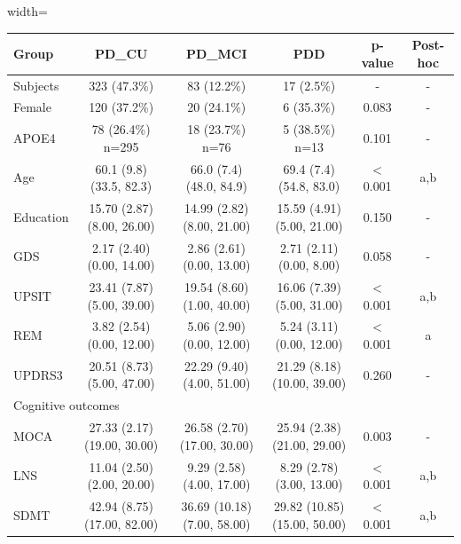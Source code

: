 \begin{description}
	\begin{table}[t]
		\begin{adjustbox}{width=\textwidth}
			\begin{tabular}{|l||c|c|c|c|c|}
				\toprule
				Group &                              PD\_CU &                             PD\_MCI &                        PDD &   p-value & Post-hoc \\ 
				\midrule
				Subjects &                        323 (47.3\%) &                         83 (12.2\%) &                          17 (2.5\%) &     -      &    -      \\
				Female &                        120 (37.2\%) &                         20 (24.1\%) &                          6 (35.3\%) &     0.083 &  -    \\
				APOE4 &                   78 (26.4\%) n=295 &                    18 (23.7\%) n=76 &                     5 (38.5\%) n=13 &     0.101 &  -    \\
				Age &            60.1 (9.8) (33.5, 82.3) &            66.0 (7.4) (48.0, 84.9) &            69.4 (7.4) (54.8, 83.0) & $<$ 0.001 &      a,b \\
				Education &         15.70 (2.87) (8.00, 26.00) &         14.99 (2.82) (8.00, 21.00) &         15.59 (4.91) (5.00, 21.00) &     0.150 &  -    \\
				\hline
				GDS &          2.17 (2.40) (0.00, 14.00) &          2.86 (2.61) (0.00, 13.00) &           2.71 (2.11) (0.00, 8.00) &     0.058 &   -   \\
				UPSIT &         23.41 (7.87) (5.00, 39.00) &         19.54 (8.60) (1.00, 40.00) &         16.06 (7.39) (5.00, 31.00) & $<$ 0.001 &      a,b \\
				REM &          3.82 (2.54) (0.00, 12.00) &          5.06 (2.90) (0.00, 12.00) &          5.24 (3.11) (0.00, 12.00) & $<$ 0.001 &        a \\
				UPDRS3 &         20.51 (8.73) (5.00, 47.00) &         22.29 (9.40) (4.00, 51.00) &        21.29 (8.18) (10.00, 39.00) &     0.260 &  -    \\
				\hline
				\multicolumn{6}{|l|}{Cognitive outcomes} \\
				\hline
				MOCA &        27.33 (2.17) (19.00, 30.00) &        26.58 (2.70) (17.00, 30.00) &        25.94 (2.38) (21.00, 29.00) &     0.003 &    -      \\
				LNS &         11.04 (2.50) (2.00, 20.00) &          9.29 (2.58) (4.00, 17.00) &          8.29 (2.78) (3.00, 13.00) & $<$ 0.001 &      a,b \\
				SDMT &        42.94 (8.75) (17.00, 82.00) &        36.69 (10.18) (7.00, 58.00) &       29.82 (10.85) (15.00, 50.00) & $<$ 0.001 &      a,b \\

\end{tabular}
\end{adjustbox}
\end{table}
\end{description}
